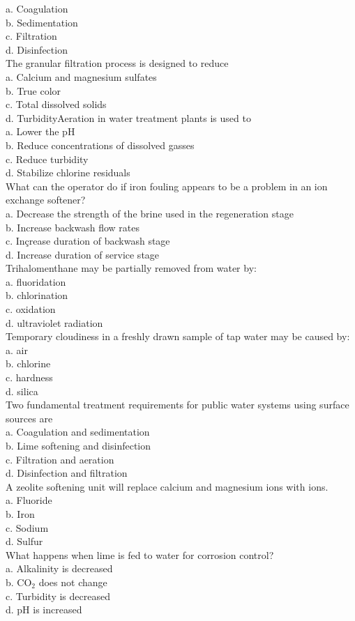 a. Coagulation\\
b. Sedimentation\\
c. Filtration\\
d. Disinfection\\
The granular filtration process is designed to reduce\\
a. Calcium and magnesium sulfates\\
b. True color\\
c. Total dissolved solids\\
d. TurbidityAeration in water treatment plants is used to\\
a. Lower the $\mathrm{pH}$\\
b. Reduce concentrations of dissolved gasses\\
c. Reduce turbidity\\
d. Stabilize chlorine residuals\\
What can the operator do if iron fouling appears to be a problem in an ion exchange softener?\\
a. Decrease the strength of the brine used in the regeneration stage\\
b. Increase backwash flow rates\\
c. Inçrease duration of backwash stage\\
d. Increase duration of service stage\\
Trihalomenthane may be partially removed from water by:\\
a. fluoridation\\
b. chlorination\\
c. oxidation\\
d. ultraviolet radiation\\
Temporary cloudiness in a freshly drawn sample of tap water may be caused by:\\
a. air\\
b. chlorine\\
c. hardness\\
d. silica\\
Two fundamental treatment requirements for public water systems using surface sources are\\
a. Coagulation and sedimentation\\
b. Lime softening and disinfection\\
c. Filtration and aeration\\
d. Disinfection and filtration\\
A zeolite softening unit will replace calcium and magnesium ions with ions.\\
a. Fluoride\\
b. Iron\\
c. Sodium\\
d. Sulfur\\
What happens when lime is fed to water for corrosion control?\\
a. Alkalinity is decreased\\
b. CO$_2$ does not change\\
c. Turbidity is decreased\\
d. pH is increased\\

